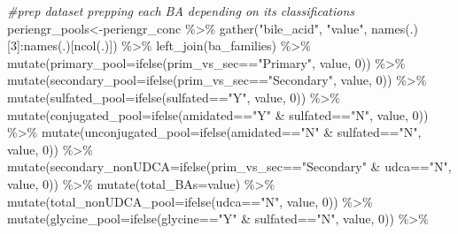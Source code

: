 \documentclass[
]{book}
\newenvironment{Shaded}{\begin{snugshade}}{\end{snugshade}}
\newcommand{\AttributeTok}[1]{\textcolor[rgb]{0.77,0.63,0.00}{#1}}
\newcommand{\CommentTok}[1]{\textcolor[rgb]{0.56,0.35,0.01}{\textit{#1}}}
\newcommand{\DecValTok}[1]{\textcolor[rgb]{0.00,0.00,0.81}{#1}}
\newcommand{\FunctionTok}[1]{\textcolor[rgb]{0.00,0.00,0.00}{#1}}
\newcommand{\NormalTok}[1]{#1}
\newcommand{\OtherTok}[1]{\textcolor[rgb]{0.56,0.35,0.01}{#1}}
\newcommand{\SpecialCharTok}[1]{\textcolor[rgb]{0.00,0.00,0.00}{#1}}
\newcommand{\StringTok}[1]{\textcolor[rgb]{0.31,0.60,0.02}{#1}}
\begin{document}
\begin{Shaded}
\begin{Highlighting}[]
\CommentTok{\#prep dataset prepping each BA depending on its classifications}
\NormalTok{periengr\_pools}\OtherTok{\textless{}{-}}\NormalTok{periengr\_conc }\SpecialCharTok{\%\textgreater{}\%} 
  \FunctionTok{gather}\NormalTok{(}\StringTok{"bile\_acid"}\NormalTok{, }\StringTok{"value"}\NormalTok{, }\FunctionTok{names}\NormalTok{(.)[}\DecValTok{3}\NormalTok{]}\SpecialCharTok{:}\FunctionTok{names}\NormalTok{(.)[}\FunctionTok{ncol}\NormalTok{(.)]) }\SpecialCharTok{\%\textgreater{}\%} 
  \FunctionTok{left\_join}\NormalTok{(ba\_families) }\SpecialCharTok{\%\textgreater{}\%} 
  \FunctionTok{mutate}\NormalTok{(}\AttributeTok{primary\_pool=}\FunctionTok{ifelse}\NormalTok{(prim\_vs\_sec}\SpecialCharTok{==}\StringTok{"Primary"}\NormalTok{, value, }\DecValTok{0}\NormalTok{)) }\SpecialCharTok{\%\textgreater{}\%} 
  \FunctionTok{mutate}\NormalTok{(}\AttributeTok{secondary\_pool=}\FunctionTok{ifelse}\NormalTok{(prim\_vs\_sec}\SpecialCharTok{==}\StringTok{"Secondary"}\NormalTok{, value, }\DecValTok{0}\NormalTok{)) }\SpecialCharTok{\%\textgreater{}\%} 
  \FunctionTok{mutate}\NormalTok{(}\AttributeTok{sulfated\_pool=}\FunctionTok{ifelse}\NormalTok{(sulfated}\SpecialCharTok{==}\StringTok{"Y"}\NormalTok{, value, }\DecValTok{0}\NormalTok{)) }\SpecialCharTok{\%\textgreater{}\%} 
  \FunctionTok{mutate}\NormalTok{(}\AttributeTok{conjugated\_pool=}\FunctionTok{ifelse}\NormalTok{(amidated}\SpecialCharTok{==}\StringTok{"Y"} \SpecialCharTok{\&}\NormalTok{ sulfated}\SpecialCharTok{==}\StringTok{"N"}\NormalTok{, value, }\DecValTok{0}\NormalTok{)) }\SpecialCharTok{\%\textgreater{}\%} 
  \FunctionTok{mutate}\NormalTok{(}\AttributeTok{unconjugated\_pool=}\FunctionTok{ifelse}\NormalTok{(amidated}\SpecialCharTok{==}\StringTok{"N"} \SpecialCharTok{\&}\NormalTok{ sulfated}\SpecialCharTok{==}\StringTok{"N"}\NormalTok{, value, }\DecValTok{0}\NormalTok{)) }\SpecialCharTok{\%\textgreater{}\%} 
  \FunctionTok{mutate}\NormalTok{(}\AttributeTok{secondary\_nonUDCA=}\FunctionTok{ifelse}\NormalTok{(prim\_vs\_sec}\SpecialCharTok{==}\StringTok{"Secondary"} \SpecialCharTok{\&}\NormalTok{ udca}\SpecialCharTok{==}\StringTok{"N"}\NormalTok{, value, }\DecValTok{0}\NormalTok{)) }\SpecialCharTok{\%\textgreater{}\%} 
  \FunctionTok{mutate}\NormalTok{(}\AttributeTok{total\_BAs=}\NormalTok{value) }\SpecialCharTok{\%\textgreater{}\%} 
  \FunctionTok{mutate}\NormalTok{(}\AttributeTok{total\_nonUDCA\_pool=}\FunctionTok{ifelse}\NormalTok{(udca}\SpecialCharTok{==}\StringTok{"N"}\NormalTok{, value, }\DecValTok{0}\NormalTok{)) }\SpecialCharTok{\%\textgreater{}\%} 
  \FunctionTok{mutate}\NormalTok{(}\AttributeTok{glycine\_pool=}\FunctionTok{ifelse}\NormalTok{(glycine}\SpecialCharTok{==}\StringTok{"Y"} \SpecialCharTok{\&}\NormalTok{ sulfated}\SpecialCharTok{==}\StringTok{"N"}\NormalTok{, value, }\DecValTok{0}\NormalTok{)) }\SpecialCharTok{\%\textgreater{}\%} 

\end{Highlighting}
\end{Shaded}
\end{document}
